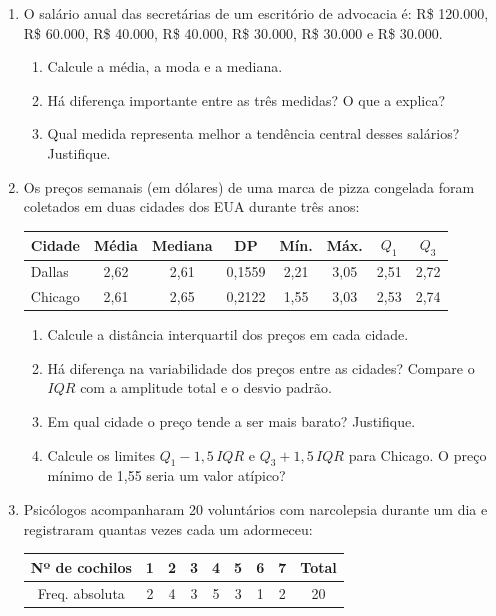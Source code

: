 \documentclass[11pt]{article}
\begin{document}
\begin{enumerate}[label=\textbf{C\arabic*.}, leftmargin=*]
\item O salário anual das secretárias de um escritório de advocacia é: R\$ 120.000, R\$ 60.000, R\$ 40.000, R\$ 40.000, R\$ 30.000, R\$ 30.000 e R\$ 30.000.
\begin{enumerate}[label=(\alph*)]
  \item Calcule a média, a moda e a mediana.
  \item Há diferença importante entre as três medidas? O que a explica?
  \item Qual medida representa melhor a tendência central desses salários? Justifique.
\end{enumerate}
\item Os preços semanais (em dólares) de uma marca de pizza congelada foram coletados em duas cidades dos EUA durante três anos:
\begin{center}
\begin{tabular}{l|ccccccc}
\toprule
Cidade & Média & Mediana & DP & Mín. & Máx. & $Q_1$ & $Q_3$ \\
\midrule
Dallas & 2,62 & 2,61 & 0,1559 & 2,21 & 3,05 & 2,51 & 2,72 \\
Chicago & 2,61 & 2,65 & 0,2122 & 1,55 & 3,03 & 2,53 & 2,74 \\
\bottomrule
\end{tabular}
\end{center}
\begin{enumerate}[label=(\alph*)]
  \item Calcule a distância interquartil dos preços em cada cidade.
  \item Há diferença na variabilidade dos preços entre as cidades? Compare o $IQR$ com a amplitude total e o desvio padrão.
  \item Em qual cidade o preço tende a ser mais barato? Justifique.
  \item Calcule os limites $Q_1 - 1{,}5\,IQR$ e $Q_3 + 1{,}5\,IQR$ para Chicago. O preço mínimo de 1,55 seria um valor atípico?
\end{enumerate}
\item Psicólogos acompanharam 20 voluntários com narcolepsia durante um dia e registraram quantas vezes cada um adormeceu:
\begin{center}
\begin{tabular}{c|ccccccc|c}
\toprule
Nº de cochilos & 1 & 2 & 3 & 4 & 5 & 6 & 7 & Total \\
\midrule
Freq. absoluta & 2 & 4 & 3 & 5 & 3 & 1 & 2 & 20 \\

\end{tabular}
\end{center}
\end{enumerate}
\end{document}
